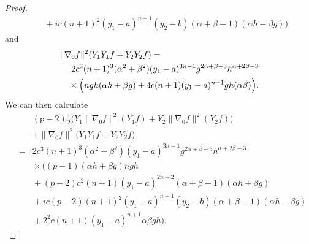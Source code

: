 \documentclass[12pt]{amsart}
\theoremstyle{plain}
\theoremstyle{definition}
\numberwithin{equation}{section}
\begin{document}
\begin{proof}
\begin{eqnarray*}
&&\mbox{}+ic(n+1)^2(y_1-a)^{n+1}(y_2-b)(\alpha+\beta-1)(\alpha h -\beta g)\Big)
\end{eqnarray*}
and
\begin{eqnarray*}
\lefteqn{\|\nabla_0f\|^2(Y_1Y_1f+Y_2Y_2f) = } & & \\ &&2c^3(n+1)^3(\alpha^2+\beta^2)(y_1-a)^{3n-1}g^{2\alpha+\beta-3}h^{\alpha+2\beta-3}\\
&&\mbox{}\times\Big(ngh(\alpha h+\beta g)+4c(n+1)(y_1-a)^{n+1}gh(\alpha\beta)\Big).
\end{eqnarray*}
We can then calculate 
\begin{eqnarray}
&&({\texttt{p}}-2)\frac{1}{2}\Big(Y_1\|\nabla_0f\|^2(Y_1f)+Y_2\|\nabla_0f\|^2(Y_2f)\Big) \nonumber\\
&& \mbox{}+\|\nabla_{0} f\|^{2}\big(Y_1Y_1f+Y_2Y_2f\big) \nonumber\\
&=& \mbox{} 2c^3(n+1)^3(\alpha ^2+\beta^2)(y_1-a)^{3n-1}g^{2\alpha+\beta-3}h^{\alpha+2\beta-3} \nonumber\\
&& \mbox{}\times\Big((p-1)(\alpha h+ \beta g)ngh \nonumber\\
&&\mbox{}+(p-2)c^2(n+1)(y_1-a)^{2n+2}(\alpha+\beta-1)(\alpha h+\beta g) \nonumber\\
&&\mbox{}+ic(p-2)(n+1)^2(y_1-a)^{n+1}(y_2-b)(\alpha +\beta -1)(\alpha h -\beta g)\nonumber\\
&&\mbox{}+2^2c(n+1)(y_1-a)^{n+1}\alpha \beta gh  \nonumber
\Big).
\end{eqnarray}
\vspace{2 mm}


\end{proof}
\end{document}

